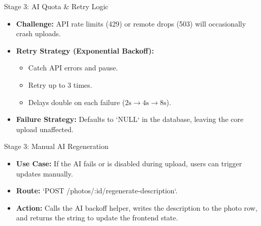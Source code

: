 \documentclass[aspectratio=169]{beamer}
\begin{document}
\begin{frame}{Stage 3: AI Quota & Retry Logic}
  \begin{itemize}
    \item \textbf{Challenge:} API rate limits (429) or remote drops (503) will occasionally crash uploads.
    \item \textbf{Retry Strategy (Exponential Backoff):}
      \begin{itemize}
        \item Catch API errors and pause.
        \item Retry up to 3 times.
        \item Delays double on each failure ($2\text{s} \to 4\text{s} \to 8\text{s}$).
      \end{itemize}
    \item \textbf{Failure Strategy:} Defaults to `NULL` in the database, leaving the core upload unaffected.
  \end{itemize}
\end{frame}

\begin{frame}{Stage 3: Manual AI Regeneration}
  \begin{itemize}
    \item \textbf{Use Case:} If the AI fails or is disabled during upload, users can trigger updates manually.
    \item \textbf{Route:} `POST /photos/:id/regenerate-description`.
    \item \textbf{Action:} Calls the AI backoff helper, writes the description to the photo row, and returns the string to update the frontend state.
  \end{itemize}
\end{frame}
\end{document}

